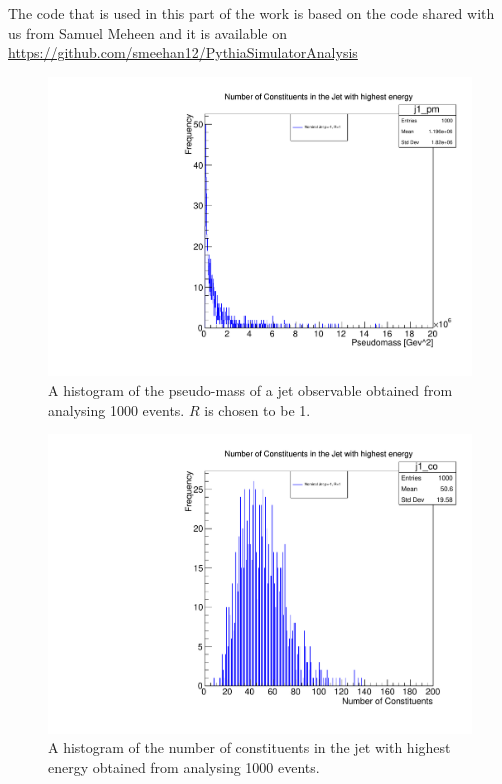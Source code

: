 The code that is used in this part of the work is based on the code shared with us from Samuel Meheen and it is available on \url{https://github.com/smeehan12/PythiaSimulatorAnalysis} 

\begin{figure}[hbtp]
\centering
\includegraphics[scale=.5]{images/myplot1.pdf}
\caption{A histogram of the pseudo-mass of a jet observable obtained from analysing 1000 events. $R$ is chosen to be 1.}
\end{figure}



\begin{figure}[hbtp]
\centering
\includegraphics[scale=.5]{images/myplot3.pdf}
\caption{A histogram of the number of constituents in the jet with highest energy obtained from analysing 1000 events.}
\end{figure}

